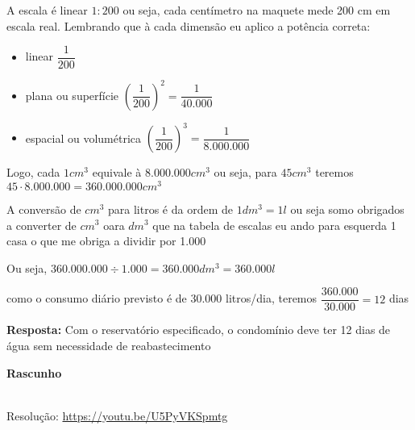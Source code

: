 A escala é linear $ 1:200 $  ou seja, cada centímetro na maquete mede 200 cm em escala real.
Lembrando que à cada dimensão eu aplico a potência correta:
\begin{itemize}
    \item linear $ \dfrac{1}{200} $
    \item plana ou superfície $ \left( \dfrac{1}{200} \right)^{2} = \dfrac{1}{40.000}  $
    \item espacial ou volumétrica $ \left( \dfrac{1}{200} \right)^{3} = \dfrac{1}{8.000.000}  $
\end{itemize}

Logo, cada $ 1 cm^3 $ equivale à $ 8.000.000 cm^3 $ ou seja, para $ 45 cm^{3}  $ teremos $ 45 \cdot 8.000.000 = 360.000.000 cm^3 $

A conversão de $ cm^3 $ para litros é da ordem de $ 1 dm^3 = 1 l $ ou seja somo obrigados a converter de $ cm^3 $ oara $ dm^3 $ que na tabela de escalas eu ando para esquerda 1 casa o que me obriga a dividir por 1.000

Ou seja, $ 360.000.000 \div 1.000 = 360.000 dm^3 = 360.000 l $

como o consumo diário previsto é de 30.000 litros/dia, teremos $ \dfrac{360.000}{30.000} = 12 $ dias

\textbf{Resposta:} Com o reservatório especificado, o condomínio deve ter 12 dias de água sem necessidade de reabastecimento

\textbf{Rascunho}

\noindent {}




\begin{center}
    \href{https://youtu.be/U5PyVKSpmtg}{
    }\\
    Resolução: \url{https://youtu.be/U5PyVKSpmtg}
\end{center}
